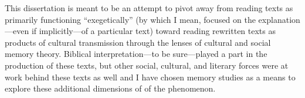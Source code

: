 

 This dissertation is meant to be an attempt to pivot away from reading \rwb texts as primarily functioning ``exegetically'' (by which I mean, focused on the explanation---even if implicitly---of a particular text) toward reading rewritten texts as products of cultural transmission through the lenses of cultural and social memory theory. Biblical interpretation---to be sure---played a part in the production of these texts, but other social, cultural, and literary forces were at work behind these texts as well and I have chosen memory studies as a means to explore these additional dimensions of of the \rwb phenomenon. 